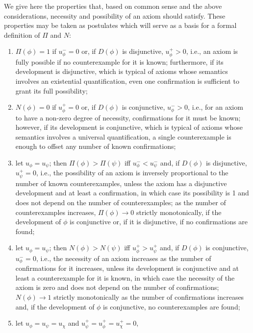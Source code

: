 \documentclass[review]{elsarticle}
\theoremstyle{definition}
\begin{document}
We give here the properties that, based on common sense and the above considerations,
necessity and possibility of an axiom should satisfy.
These properties may be taken as postulates which will serve as a basis for
a formal definition of $\Pi$ and $N$:
\begin{enumerate}
\item\label{full-possibility}
  $\Pi(\phi) = 1$ if $u_\phi^- = 0$ or, if $D(\phi)$ is disjunctive, $u_\phi^+ > 0$,
  i.e., an axiom is fully possible if no counterexample for it is known; 
  furthermore, if its development is disjunctive, which is typical of axioms whose semantics involves an existential quantification, even one confirmation is sufficient to grant its full possibility;
\item\label{zero-necessity}
  $N(\phi) = 0$ if $u_\phi^+ = 0$ or, if $D(\phi)$ is conjunctive, $u_\phi^- > 0$,
  i.e., for an axiom to have a non-zero degree of necessity, confirmations for it must be known; 
  however, if its development is conjunctive, which is typical of axioms whose semantics involves a universal quantification, a single counterexample is enough to offset any number of known confirmations;
\item\label{increasing-poss}
  let $u_\phi = u_\psi$; then $\Pi(\phi) > \Pi(\psi)$ iff $u_\phi^- < u_\psi^-$
  and, if $D(\phi)$ is disjunctive, $u_\psi^+ = 0$,
  i.e., the possibility of an axiom is inversely proportional to the number
  of known counterexamples, unless the axiom has a disjunctive development
  and at least a confirmation, in which case its possibility is 1 and does not
  depend on the number of counterexamples;
  as the number of counterexamples increases, $\Pi(\phi) \to 0$ strictly monotonically, if the development of $\phi$ is conjunctive or, if it is disjunctive, if no confirmations are found;
\item\label{increasing-nec}
  let $u_\phi = u_\psi$; then $N(\phi) > N(\psi)$ iff $u_\phi^+ > u_\psi^+$
  and, if $D(\phi)$ is conjunctive, $u_\phi^- = 0$,
  i.e., the necessity of an axiom increases as the number of confirmations for it
  increases, unless its development is conjunctive and at least a counterexample
  for it is known, in which case the necessity of the axiom is zero and does not
  depend on the number of confirmations;
  $N(\phi) \to 1$ strictly monotonically as the number of confirmations increases and, if the development of $\phi$ is conjunctive, no counterexamples are found;
\item\label{decreasing-marginal-poss}
  let $u_\phi = u_\psi = u_\chi$ and $u_\psi^+ = u_\phi^+ = u_\chi^+ = 0$,

\end{enumerate}
\end{document}
